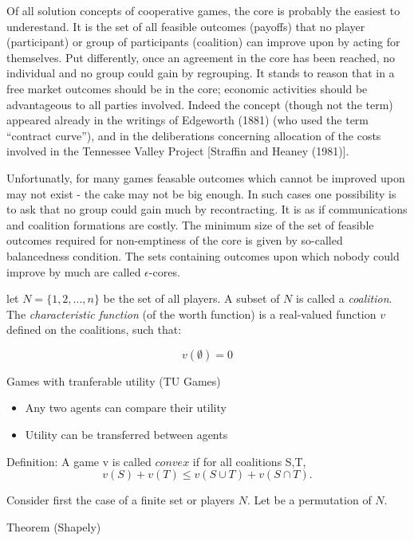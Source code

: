 \documentclass{article}
\begin{document}
Of all solution concepts of cooperative games, the core is probably the easiest to underestand. It is the set of all feasible outcomes (payoffs) that no player (participant) or group of participants (coalition) can improve upon by acting for themselves. Put differently, once an agreement in the core has been reached, no individual and no group could gain by regrouping. It stands to reason that in a free market outcomes should be in the core; economic activities should be advantageous to all parties involved. Indeed the concept (though not the term) appeared already in the writings of Edgeworth (1881) (who used the term ``contract curve''), and in the deliberations concerning allocation of the costs involved in the Tennessee Valley Project [Straffin and Heaney (1981)].

Unfortunatly, for many games feasable outcomes which cannot be improved upon may not exist - the cake may not be big enough. In such cases one possibility is to ask that no group could gain much by recontracting. It is as if communications and coalition formations are costly. The minimum size of the set of feasible outcomes required for non-emptiness of the core is given by so-called balancedness condition. The sets containing outcomes upon which nobody could improve by much are called $\epsilon$-cores. 

let $N = \{1,2,...,n\}$ be the set of all players. A subset of $N$ is called a \emph{coalition}. The \textit{characteristic function} (of the worth function) is a real-valued function $v$ defined on the coalitions, such that:

\begin{equation}\label{eq:v0}
v(\emptyset) = 0
\end{equation}


Games with tranferable utility (TU Games)
\begin{itemize}
	\item Any two agents can compare their utility
	\item Utility can be transferred between agents
\end{itemize}

Definition: A game v is called $convex$ if for all coalitions S,T,
\begin{equation}\label{eq:con1}
v(S) + v(T) \leq v(S \cup T) + v(S \cap T).
\end{equation}

Consider first the case of a finite set or players $N$. Let \pi be a permutation of $N$.

Theorem (Shapely) 
\end{document}
